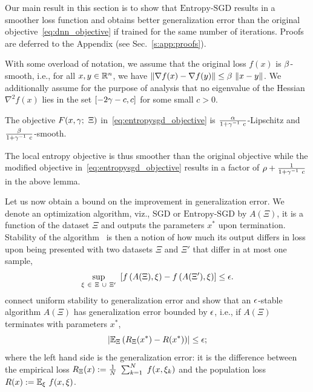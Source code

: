 \documentclass[10pt]{article}
\newcommand{\entropysgd}{\mathrm{Entropy}\textrm{-}\mathrm{SGD}}
\begin{document}
Our main result in this section is to show that $\entropysgd$ results in a smoother loss function and obtains better generalization error than the original objective~\eqref{eq:dnn_objective} if trained for the same number of iterations. Proofs are deferred to the Appendix (see Sec.~\ref{s:app:proofs}).

With some overload of notation, we assume that the original loss $f(x)$ is $\beta$-smooth, i.e., for all $x,y \in \mathbb{R}^n$, we have $\norm{\nabla f(x) - \nabla f(y)} \leq \b\ \norm{x-y}$. We additionally assume for the purpose of analysis that no eigenvalue of the Hessian $\nabla^2 f(x)$ lies in the set $[-2 \gamma-c, c]$ for some small $c > 0$.
%
\begin{lemma}
\label{lem:smoothness_reduction}
The objective $F(x, \gamma;\ \Xi)$ in~\eqref{eq:entropysgd_objective} is $\frac{\alpha}{1 + \gamma^{-1}\ c}$-Lipschitz and $\f{\b}{1 + \g^{-1}\ c}$-smooth.
\end{lemma}
The local entropy objective is thus smoother than the original objective while the modified objective in~\eqref{eq:entropysgd_objective} results in a factor of $\rho + \frac{1}{1 + \gamma^{-1}\ c}$ in the above lemma.

Let us now obtain a bound on the improvement in generalization error. We denote an optimization algorithm, viz., SGD or $\entropysgd$ by $A(\Xi)$, it is a function of the dataset $\Xi$ and outputs the parameters $x^*$ upon termination. Stability of the algorithm~\citep{bousquet2002stability} is then a notion of how much its output differs in loss upon being presented with two datasets $\Xi$ and $\Xi'$ that differ in at most one sample,
$$
    \sup_{\xi\ \in\ \Xi\ \cup\ \Xi'}\ \left[ f \left(A(\Xi), \xi\right) - f \left(A(\Xi'), \xi\right)\right] \leq \epsilon.
$$
\citet{hardt2015train} connect uniform stability to generalization error and show that an $\epsilon$-stable algorithm $A(\Xi)$ has generalization error bounded by $\epsilon$, i.e., if $A(\Xi)$ terminates with parameters $x^*$,
$$
    \left|  \mathbb{E}_{\Xi} \left(R_\Xi(x^*) - R(x^*)\right)  \right| \leq \epsilon;
$$
where the left hand side is the generalization error: it is the difference between the empirical loss $R_\Xi(x) := \frac{1}{N}\ \sum_{k=1}^N\ f(x, \xi_k)$ and the population loss $R(x) := \mathbb{E}_{\xi}\ f(x, \xi)$.
\end{document}
